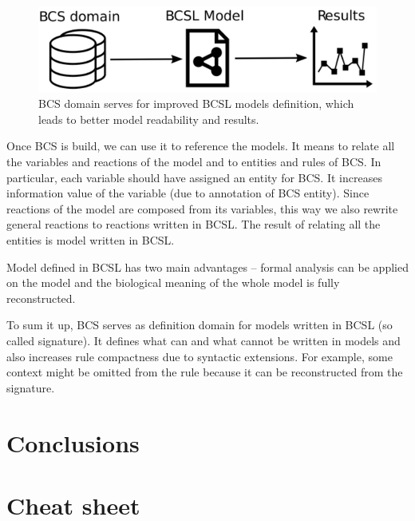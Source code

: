 \documentclass[12pt]{fithesis2}
\begin{document}
\begin{figure}[!h]
\begin{center}
  \includegraphics[scale=0.13]{pics/bcsl_vs_bcs.pdf}
\end{center}
\caption{BCS domain serves for improved BCSL models definition, which leads to better model readability and results.}
\end{figure}

Once BCS is build, we can use it to reference the models. It means to relate all the variables and reactions of the model and to entities and rules of BCS. In particular, each variable should have assigned an entity for BCS. It increases information value of the variable (due to annotation of BCS entity). Since reactions of the model are composed from its variables, this way we also rewrite general reactions to reactions written in BCSL. The result of relating all the entities is model written in BCSL. 

Model defined in BCSL has two main advantages -- formal analysis can be applied on the model and the biological meaning of the whole model is fully reconstructed.

To sum it up, BCS serves as definition domain for models written in BCSL (so called signature). It defines what can and what cannot be written in models and also increases rule compactness due to syntactic extensions. For example, some context might be omitted from the rule because it can be reconstructed from the signature.

\chapter{Conclusions}




\appendix

\chapter{Cheat sheet}
\end{document}
